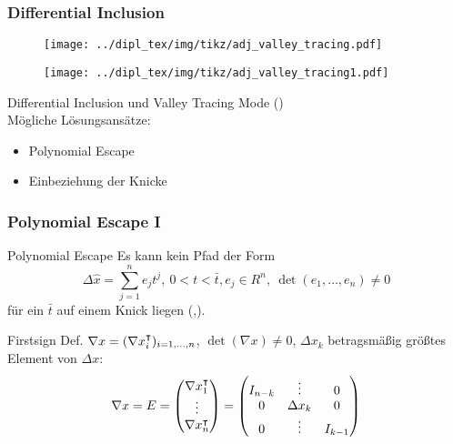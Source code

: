 \begin{frame}[<+->]
\frametitle{Differential Inclusion}
\centering
\begin{figure}
  \begin{minipage}{0.45\textwidth} 
	\texttt{[image: ../dipl\_tex/img/tikz/adj\_valley\_tracing.pdf]}
	\end{minipage}
	\hfill
	\begin{minipage}{0.45\textwidth}
	\texttt{[image: ../dipl\_tex/img/tikz/adj\_valley\_tracing1.pdf]}	
	\end{minipage}
	
\end{figure}
Differential Inclusion und Valley Tracing Mode (\cite{khan2014}) \\
\pause
Mögliche Lösungsansätze:\hfill
\begin{itemize}
 \item Polynomial Escape
 \item Einbeziehung der Knicke
\end{itemize}
\end{frame}
\begin{frame}[<+->]
\frametitle{Polynomial Escape I}
\vspace*{-0.1cm} 
\begin{block}{Polynomial Escape \cite[Prop. 6]{monster}}
 Es kann kein Pfad der Form
 \vspace*{-0.3cm}
 \[\Delta \hat x = \sum_{j=1}^n e_j t^j, ~ 0<t<\bar t, e_j\in R^n,~ \det(e_1,\ldots,e_n) \neq 0\]
 \vspace*{0.3cm}
 für ein $\bar t$ auf einem Knick liegen (\cite[Proposition 6]{monster},\cite[S.11]{plan}).
\end{block}
\vspace*{-0.1cm} 
\begin{block}{Firstsign}
 Def. $\nabla x = (\nabla x_i^\intercal)_{i=1,\ldots,n}$, $\det(\nabla x)\neq 0$, $\Delta x_k$ betragsmäßig größtes Element von $\Delta x$: 
 \vspace*{-0.3cm}
 \[
 \nabla x = E =
\begin{pmatrix}
  \nabla x_1^\intercal\\
  \vdots\\
  \nabla x_n^\intercal\\
 \end{pmatrix}
 =
  \begin{pmatrix}
   I_{n-k} & \vdots &0\\
  0 & \Delta x_k & 0\\
    0 & \vdots&I_{k-1}
 \end{pmatrix}
\]

\end{block}

\end{frame}

